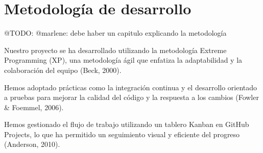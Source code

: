 \chapter{Metodología de desarrollo}\label{ch:chapter_3}

\colorbox{color_highlight}{@TODO: @marlene:}  debe haber un capitulo explicando la metodología

Nuestro proyecto se ha desarrollado utilizando la metodología Extreme
Programming (XP), una metodología ágil que enfatiza la adaptabilidad y la colaboración del equipo (Beck, 2000).

Hemos adoptado prácticas como la integración continua y el desarrollo orientado a pruebas para mejorar la
calidad del código y la respuesta a los cambios (Fowler \& Foemmel, 2006).

Hemos gestionado el flujo de trabajo utilizando un tablero Kanban en GitHub Projects, lo que ha permitido un seguimiento
visual y eficiente del progreso (Anderson, 2010).